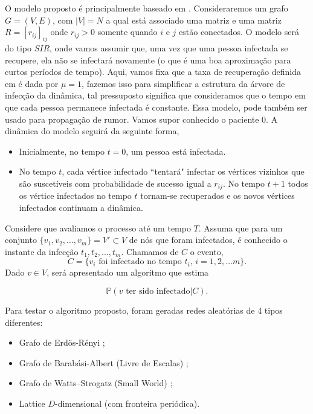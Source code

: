 \documentclass{article}
\newcommand{\Pp}{\mathbb{P}}
\begin{document}
O modelo proposto é principalmente baseado em \cite{Main, Main2}. Consideraremos um grafo $G = (V,E)$, com $|V| = N$ a qual está associado uma matriz e uma matriz $R = [r_{ij}]_{ij}$ onde $r_{ij} > 0$ somente quando $i$ e $j$ estão conectados. O modelo será do tipo $SIR$, onde vamos assumir que, uma vez que uma pessoa infectada se recupere, ela não se infectará novamente (o que é uma boa aproximação para curtos períodos de tempo). Aqui, vamos fixa que a taxa de recuperação definida em \cite{Main} é dada por $\mu = 1$, fazemos isso para simplificar a estrutura da árvore de infecção da dinâmica, tal pressuposto significa que consideramos que o tempo em que cada pessoa permanece infectada é constante. Essa modelo, pode também ser usado para propagação de rumor. Vamos supor conhecido o paciente 0. A dinâmica do modelo seguirá da seguinte forma,

\begin{itemize}
    \item Inicialmente, no tempo $t = 0$, um pessoa está infectada.
    \item No tempo $t$, cada vértice infectado ``tentará" infectar os vértices vizinhos que são suscetíveis com probabilidade de sucesso igual a $r_{ij}$. No tempo $t + 1$ todos os vértice infectados no tempo $t$ tornam-se recuperados e os novos vértices infectados continuam a dinâmica. 
\end{itemize}

Considere que avaliamos o processo até um tempo $T$. Assuma que para um conjunto $ \{v_1, v_2, \dots, v_m\} = V' \subset V$ de nós que foram infectados, é conhecido o instante da infecção $t_1, t_2, \dots, t_m$. Chamamos de $C$ o evento,
\[C = \{v_i \textrm{ foi infectado no tempo } t_i, \, i = 1,2, \dots m\}.\]
Dado $v \in V$, será apresentado um algoritmo que estima

\[\Pp(v \textrm{ ter sido infectado}|C).\]

Para testar o algoritmo proposto, foram geradas redes aleatórias de 4 tipos diferentes:

\begin{itemize}
    \item Grafo de Erdös-Rényi \cite{Erdos, ErdosNx};
    \item Grafo de Barabási-Albert (Livre de Escalas) \cite{barabasi, barbasiNx};
    \item Grafo de Watts–Strogatz (Small World) \cite{Small, SmallNx};
    \item Lattice $D$-dimensional (com fronteira periódica).
\end{itemize}
\end{document}
